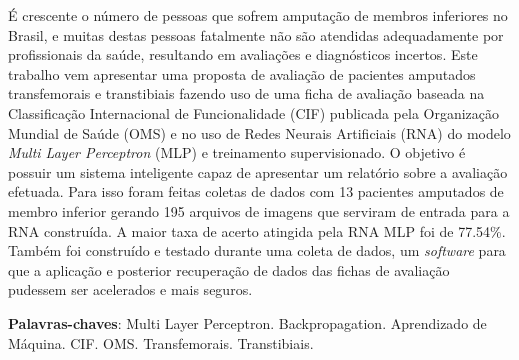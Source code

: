 \begin{resumo}

 É crescente o número de pessoas que sofrem amputação de membros inferiores no Brasil, e muitas destas pessoas fatalmente não são atendidas adequadamente por profissionais da saúde, resultando em avaliações e diagnósticos incertos. Este trabalho vem apresentar uma proposta de avaliação de pacientes amputados transfemorais e transtibiais fazendo uso de uma ficha de avaliação baseada na Classificação Internacional de Funcionalidade (CIF) publicada pela Organização Mundial de Saúde (OMS) e no uso de Redes Neurais Artificiais (RNA) do modelo \textit{Multi Layer Perceptron} (MLP) e treinamento supervisionado. O objetivo é possuir um sistema inteligente capaz de apresentar um relatório sobre a avaliação efetuada. Para isso foram feitas coletas de dados com 13 pacientes amputados de membro inferior gerando 195 arquivos de imagens que serviram de entrada para a RNA construída. A maior taxa de acerto atingida pela RNA MLP foi de 77.54\%. Também foi construído e testado durante uma coleta de dados, um \textit{software} para que a aplicação e posterior recuperação de dados das fichas de avaliação pudessem ser acelerados e mais seguros.



 \vspace{\onelineskip}

 \noindent
 \textbf{Palavras-chaves}: Multi Layer Perceptron. Backpropagation. Aprendizado de Máquina. CIF. OMS. Transfemorais. Transtibiais.
\end{resumo}
